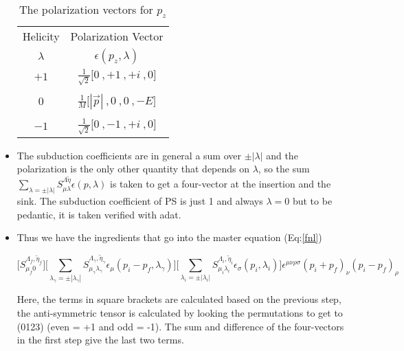 \documentclass[10pt]{article}
\begin{document}
\begin{itemize}
\begin{table}[!htbp]
\centering
\hspace{9mm}
\begin{minipage}{0.33\linewidth}
\begin{tabular}{c|c}

Helicity & Polarization Vector \\ 
$\lambda$ & $\epsilon(p_z,\lambda)$ \\

\hline
$+1$ & $\frac{1}{\sqrt{2}}\Big[ 0\ , +1\ , +i\ ,0 \Big]$ \\ \\
$0$ & $\frac{1}{M}\Big[|\vec{p}| \ , 0\ ,0\ , -E \Big]$\\ \\
$-1$ & $\frac{1}{\sqrt{2}}\Big[  0\ , -1\ , +i\ ,0 \Big]$ \\


\end{tabular}
\end{minipage}
\caption{The polarization vectors for $p_z$}
\label{pol_table}
\end{table}


	\item The subduction coefficients are in general a sum over $\pm|\lambda|$ and the polarization is the only other quantity that depends on $\lambda$, so the sum $\sum_{\lambda = \pm|\lambda|} S^{\Lambda \tilde{\eta}}_{\mu \lambda} \epsilon(p,\lambda)$ is taken to get a four-vector at the insertion and the sink. The subduction coefficient of PS is just 1 and always $\lambda = 0 $ but to be pedantic, it is taken verified with adat.
	\item Thus we have the ingredients that go into the master equation (Eq:\ref{fnl})
	
\begin{equation}
\label{fh}
\Big[ S^{ \Lambda_f,\tilde{\eta}_f  }_{\mu_f 0} \Big] 
\Big[ \sum_{\lambda_{\gamma} = \pm|\lambda_{\gamma}|} S^{ \Lambda_{\gamma},\tilde{\eta}_{\gamma}  }_{\mu_{\gamma} \lambda_{\gamma} } \epsilon_{\mu}(p_i - p_f, \lambda_{\gamma})\Big ] 
\Big[  \sum_{\lambda_i = \pm|\lambda_i| } S^{ \Lambda_i,\tilde{\eta}_i  }_{\mu_i\lambda_i} \epsilon_{\sigma}(p_i, \lambda_i) \Big]  \epsilon^{\mu\nu\rho\sigma}(p_i + p_f)_{\nu}(p_i - p_f)_{\rho}
\end{equation}

Here, the terms in square brackets are calculated based on the previous step, the anti-symmetric tensor is calculated by looking the permutations to get to (0123) (even = +1 and odd = -1). The sum and difference of the four-vectors in the first step give the last two terms.
\end{itemize}
\end{document}
